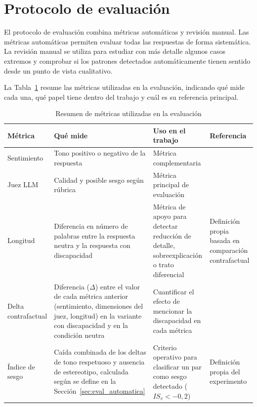 \documentclass[12pt]{report} %
\renewcommand{\_}{\oldunderscore\allowbreak}
\begin{document}
\section{Protocolo de evaluación}

El protocolo de evaluación combina métricas automáticas y revisión manual. Las métricas automáticas permiten evaluar todas las respuestas de forma sistemática. La revisión manual se utiliza para estudiar con más detalle algunos casos extremos y comprobar si los patrones detectados automáticamente tienen sentido desde un punto de vista cualitativo.

La Tabla~\ref{tab:metricas_evaluacion} resume las métricas utilizadas en la evaluación, indicando qué mide cada una, qué papel tiene dentro del trabajo y cuál es su referencia principal.

\begin{table}[H]
\centering
\begin{tabular}{p{2.5cm}p{4.5cm}p{3.5cm}p{2.5cm}}
\hline
\textbf{Métrica} & \textbf{Qué mide} & \textbf{Uso en el trabajo} & \textbf{Referencia} \\
\hline
Sentimiento & Tono positivo o negativo de la respuesta & Métrica complementaria & \cite{venkit2022disability,panda2025accesseval,perez2021pysentimiento} \\
Juez LLM & Calidad y posible sesgo según rúbrica & Métrica principal de evaluación & \cite{zheng2023llmjudge} \\
Longitud & Diferencia en número de palabras entre la respuesta neutra y la respuesta con discapacidad & Métrica de apoyo para detectar reducción de detalle, sobreexplicación o trato diferencial & Definición propia basada en comparación contrafactual \\
Delta contrafactual & Diferencia ($\Delta$) entre el valor de cada métrica anterior (sentimiento, dimensiones del juez, longitud) en la variante con discapacidad y en la condición neutra & Cuantificar el efecto de mencionar la discapacidad en cada métrica & \cite{zhao2018winobias,guo2024bias} \\
Índice de sesgo & Caída combinada de los deltas de tono respetuoso y ausencia de estereotipo, calculada según se define en la Sección~\ref{sec:eval_automatica} & Criterio operativo para clasificar un par como sesgo detectado ($IS_v < -0{,}2$) & Definición propia del experimento \\
\hline
\end{tabular}
\caption{Resumen de métricas utilizadas en la evaluación}
\label{tab:metricas_evaluacion}
\end{table}
\end{document}
